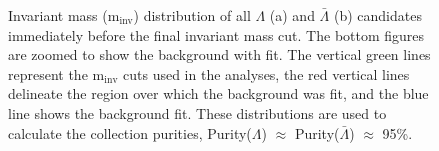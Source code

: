 \documentclass[../AnalysisNoteJBuxton.tex]{subfiles}
\begin{document}
\begin{figure}[h!]
  \centering
  \caption[$\Lambda$ and $\bar{\Lambda}$ Purity]{Invariant mass (m$_{\mathrm{inv}}$) distribution of all $\Lambda$ (a) and $\bar{\Lambda}$ (b) candidates immediately before the final invariant mass cut.  The bottom figures are zoomed to show the background with fit.  The vertical green lines represent the m$_{\mathrm{inv}}$ cuts used in the analyses, the red vertical lines delineate the region over which the background was fit, and the blue line shows the background fit.  These distributions are used to calculate the collection purities, Purity($\Lambda$) $\approx$ Purity($\bar{\Lambda}$) $\approx$ 95\%.}
  \label{fig:cLamPurity}
\end{figure}
\end{document}
